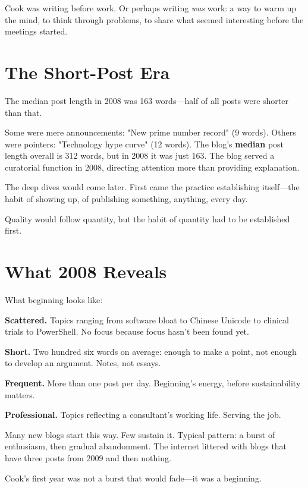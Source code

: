 Cook was writing before work. Or perhaps writing \textit{was} work: a way to warm up the mind, to think through problems, to share what seemed interesting before the meetings started.

\bigskip

\section*{The Short-Post Era}

The median post length in 2008 was 163 words---half of all posts were shorter than that.

Some were mere announcements: "New prime number record" (9 words). Others were pointers: "Technology hype curve" (12 words). The blog's \textbf{median} post length overall is 312 words, but in 2008 it was just 163. The blog served a curatorial function in 2008, directing attention more than providing explanation.

The deep dives would come later. First came the practice establishing itself---the habit of showing up, of publishing something, anything, every day.

Quality would follow quantity, but the habit of quantity had to be established first.

\bigskip

\section*{What 2008 Reveals}

What beginning looks like:

\textbf{Scattered.} Topics ranging from software bloat to Chinese Unicode to clinical trials to PowerShell. No focus because focus hasn't been found yet.

\textbf{Short.} Two hundred six words on average: enough to make a point, not enough to develop an argument. Notes, not essays.

\textbf{Frequent.} More than one post per day. Beginning's energy, before sustainability matters.

\textbf{Professional.} Topics reflecting a consultant's working life. Serving the job.

Many new blogs start this way. Few sustain it. Typical pattern: a burst of enthusiasm, then gradual abandonment. The internet littered with blogs that have three posts from 2009 and then nothing.

Cook's first year was not a burst that would fade---it was a beginning.

